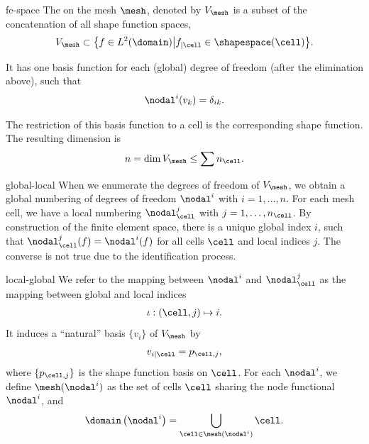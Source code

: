 \begin{Definition}{fe-space}
  The  on the mesh $\mesh$, denoted by
  $V_\mesh$ is a subset of the concatenation of all shape function
  spaces,
  \begin{gather}
    V_\mesh \subset \bigl\{ f\in L^2(\domain) \big|
    f_{|\cell} \in \shapespace(\cell) \bigr\}.
  \end{gather}
  
  It has one basis function for each (global) degree of freedom (after the elimination above), such
  that
  \begin{gather}
    \nodal^i(v_k) = \delta_{ik}.
  \end{gather}

  The restriction of this basis function to a cell is the
  corresponding shape function.  The resulting dimension is
  \begin{gather}
    n = \dim V_\mesh \le \sum n_\cell.
  \end{gather}
\end{Definition}

\begin{Notation}{global-local}
  When we enumerate the degrees of freedom of $V_\mesh$, we obtain a
  global numbering of degrees of freedom $\nodal^i$ with
  $i=1,\dots,n$. For each mesh cell, we have a local numbering
  $\nodal_\cell^j$ with $j=1,\dots,n_{\cell}$. By construction of the finite
  element space, there is a unique global index $i$, such that
  $\nodal_\cell^j(f) = \nodal^i(f)$ for all cells $\cell$ and local
  indices $j$. The converse is not true due to the identification
  process.
\end{Notation}

\begin{Definition}{local-global}
  We refer to the mapping between $\nodal^i$ and $\nodal_\cell^j$ as
  the mapping between global and local indices
  \begin{gather}
    \iota: (\cell, j) \mapsto i.
  \end{gather}
  It induces a
  ``natural'' basis $\{v_i\}$ of $V_\mesh$ by
  \begin{gather}
    v_{i|\cell} = p_{\cell,j},
  \end{gather}
  where $\{p_{\cell,j}\}$ is the shape function basis on $\cell$. For
  each $\nodal^i$, we define $\mesh(\nodal^i)$ as the set of cells
  $\cell$ sharing the node functional $\nodal^i$, and
  \begin{gather}
    \domain\left(\nodal^i\right) = \bigcup_{\cell\in \mesh(\nodal^i)} \cell.
  \end{gather}
\end{Definition}

